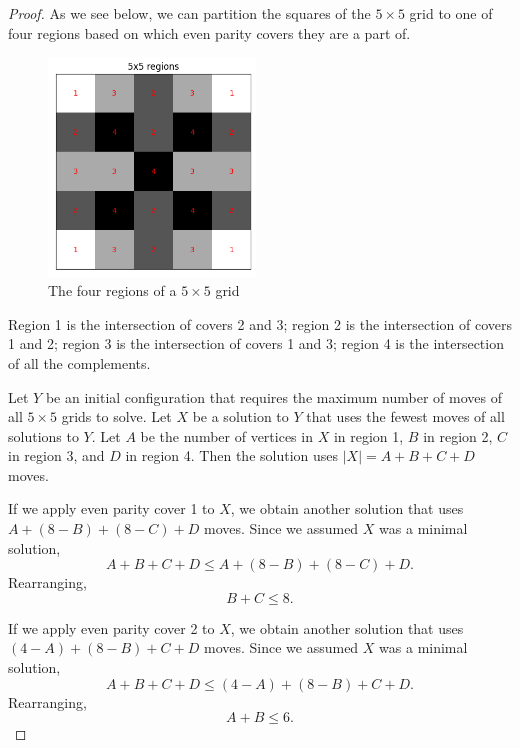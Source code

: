 \documentclass[a4paper]{article}
\newcommand{\abs}[1]{\left| #1 \right|}
\begin{document}
\begin{proof}
		As we see below, we can partition the squares of the $5 \times 5$ grid to one of four regions based on which even parity covers they are a part of.
		
		\begin{figure}[H]
			\centering
			\includegraphics[width=0.49\textwidth]{../../code/serialization/regions/5x5_regions.png}
			\caption{The four regions of a $5 \times 5$ grid}
		\end{figure}
	
		Region 1 is the intersection of covers 2 and 3; region 2 is the intersection of  covers 1 and 2; region 3 is the intersection of covers 1 and 3;
		region 4 is the intersection of all the complements.
		
		Let $Y$ be an initial configuration that requires the maximum number of moves of all $5 \times 5 $ grids to solve.
		Let $X$ be a solution to $Y$ that uses the fewest moves of all solutions to $Y$.
		Let $A$ be the number of vertices in $X$ in region 1, $B$ in region 2, $C$ in region 3, and $D$ in region 4.
		Then the solution uses $\abs{X} = A + B + C + D$ moves.
		
		If we apply even parity cover 1 to $X$, we obtain another solution that uses $A + (8 - B) + (8 - C) + D$ moves.
		Since we assumed $X$ was a minimal solution,
		\begin{equation*}
			A + B + C + D \leq A + (8 - B) + (8 - C) + D.
		\end{equation*}
		Rearranging,
		\begin{equation}\label{5x5_constr1}
			B + C \leq 8.
		\end{equation}
	
		If we apply even parity cover 2 to $X$, we obtain another solution that uses $(4 - A) + (8 - B) + C + D$ moves.
		Since we assumed $X$ was a minimal solution,
		\begin{equation*}
			A + B + C + D \leq (4 - A) + (8 - B) + C + D.
		\end{equation*}
		Rearranging,
		\begin{equation}\label{5x5_constr2}
			A + B \leq 6.
		\end{equation}
	

\end{proof}
\end{document}
